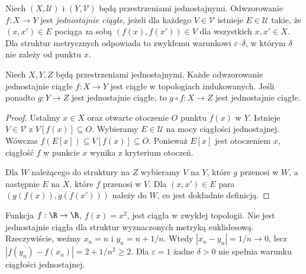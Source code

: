 \begin{definicja}
\label{def:topog-jednostajne-ciaglosc}
Niech $(X,\mathcal U)$ i $(Y,\mathcal V)$
będą przestrzeniami jednostajnymi.
Odwzorowanie $f:X\to Y$ jest
\emph{jednostajnie ciągłe}, jeżeli
dla każdego $V\in\mathcal V$ istnieje
$E\in\mathcal U$ takie, że
$(x,x')\in E$ pociąga za sobą
$(f(x),f(x'))\in V$ dla wszystkich $x,x'\in X$.
Dla struktur metrycznych odpowiada to
zwykłemu warunkowi $\varepsilon$--$\delta$,
w którym $\delta$ nie zależy od punktu $x$.
\end{definicja}

\begin{twierdzenie}
\label{thm:topog-jednostajne-ciaglosc-wlasnosci}
Niech $X,Y,Z$ będą przestrzeniami jednostajnymi.
Każde odwzorowanie jednostajnie ciągłe
$f:X\to Y$ jest ciągłe w topologiach
indukowanych. Jeśli ponadto
$g:Y\to Z$ jest jednostajnie ciągłe,
to $g\circ f:X\to Z$ jest jednostajnie ciągłe.
\end{twierdzenie}
\begin{proof}
Ustalmy $x\in X$ oraz otwarte otoczenie
$O$ punktu $f(x)$ w $Y$. Istnieje
$V\in\mathcal V$ z $V[f(x)]\subseteq O$.
Wybieramy $E\in\mathcal U$ na mocy
ciągłości jednostajnej. Wówczas
$f(E[x])\subseteq V[f(x)]\subseteq O$.
Ponieważ $E[x]$ jest otoczeniem $x$,
ciągłość $f$ w punkcie $x$ wynika z
kryterium otoczeń.

Dla $W$ należącego do struktury na $Z$
wybieramy $V$ na $Y$, które $g$ przenosi
w $W$, a następnie $E$ na $X$, które
$f$ przenosi w $V$. Dla $(x,x')\in E$
para $(g(f(x)),g(f(x')))$ należy do $W$,
co jest dokładnie definicją.
\end{proof}

\begin{przyklad}
\label{ex:topog-jednostajne-kwadrat}
Funkcja $f:\R\to\R$, $f(x)=x^2$, jest
ciągła w zwykłej topologii.
Nie jest jednostajnie ciągła dla
struktur wyznaczonych metryką euklidesową.
Rzeczywiście, weźmy $x_n=n$ i
$y_n=n+1/n$. Wtedy $|x_n-y_n|=1/n\to0$,
lecz $|f(y_n)-f(x_n)|=2+1/n^2\ge2$.
Dla $\varepsilon=1$ żadne $\delta>0$
nie spełnia warunku ciągłości jednostajnej.
\end{przyklad}

